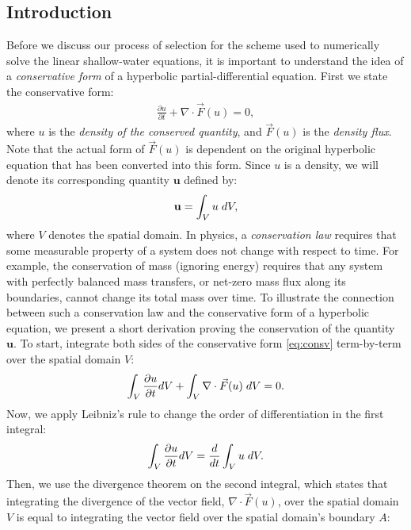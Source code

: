 \documentclass[../main.tex]{subfiles}
\begin{document}
\subsection{Introduction}
Before we discuss our process of selection for the scheme used to numerically solve the linear shallow-water equations, it is important to understand the idea of a \textit{conservative form} of a hyperbolic partial-differential equation. First we state the conservative form:
\begin{gather}\label{eq:consv}
	\frac{\partial u}{\partial t} + \nabla \cdot \vec F(u) = 0,
\end{gather}
where $u$ is the \textit{density of the conserved quantity}, and $\vec F (u)$ is the \textit{density flux}. Note that the actual form of $\vec F(u)$ is dependent on the original hyperbolic equation that has been converted into this form. Since $u$ is a density, we will denote its corresponding quantity $\mathbf{u}$ defined by:
\begin{gather}\label{eq:dens}
	\mathbf{u} = \int_V u\hspace*{0.10 cm} dV,
\end{gather}
where $V$ denotes the spatial domain. In physics, a \textit{conservation law} requires that some measurable property of a system does not change with respect to time. For example, the conservation of mass (ignoring energy) requires that any system with perfectly balanced mass transfers, or net-zero mass flux along its boundaries, cannot change its total mass over time. To illustrate the connection between such a conservation law and the conservative form of a hyperbolic equation, we present a short derivation proving the conservation of the quantity $\mathbf{u}$. To start, integrate both sides of the conservative form \ref{eq:consv} term-by-term over the spatial domain $V$:
\begin{gather}\label{eq:int}
	\int_V \frac{\partial u}{\partial t} dV + \int_V \nabla \cdot \vec F(u)\hspace*{0.10 cm} dV = 0.
\end{gather}
Now, we apply Leibniz's rule to change the order of differentiation in the first integral:
\begin{gather}\label{eq:s1}
	\int_V \frac{\partial u}{\partial t} dV = \frac{d}{dt} \int_V u\hspace*{0.10 cm} dV.
\end{gather}
Then, we use the divergence theorem on the second integral, which states that integrating the divergence of the vector field, $\nabla \cdot \vec F(u)$, over the spatial domain $V$ is equal to integrating the vector field over the spatial domain's boundary $A$:
\end{document}
